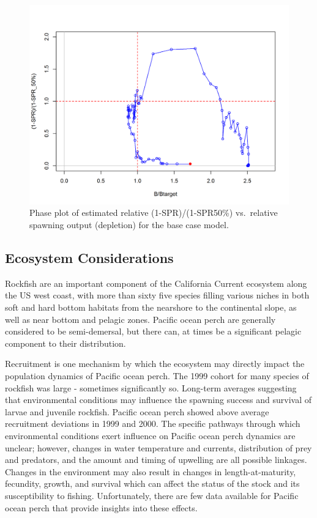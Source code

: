 \documentclass[12pt,]{article}
\begin{document}
\begin{figure}
\centering
\includegraphics{r4ss/plots_mod1/SPR4_phase.png}
\caption{Phase plot of estimated relative (1-SPR)/(1-SPR50\%)
vs.~relative spawning output (depletion) for the base case
model.\label{fig:Phase_all}}
\end{figure}

\FloatBarrier

\subsection*{Ecosystem Considerations}\label{ecosystem-considerations}

Rockfish are an important component of the California Current ecosystem
along the US west coast, with more than sixty five species filling
various niches in both soft and hard bottom habitats from the nearshore
to the continental slope, as well as near bottom and pelagic zones.
Pacific ocean perch are generally considered to be semi-demersal, but
there can, at times be a significant pelagic component to their
distribution.

Recruitment is one mechanism by which the ecosystem may directly impact
the population dynamics of Pacific ocean perch. The 1999 cohort for many
species of rockfish was large - sometimes significantly so. Long-term
averages suggesting that environmental conditions may influence the
spawning success and survival of larvae and juvenile rockfish. Pacific
ocean perch showed above average recruitment deviations in 1999 and
2000. The specific pathways through which environmental conditions exert
influence on Pacific ocean perch dynamics are unclear; however, changes
in water temperature and currents, distribution of prey and predators,
and the amount and timing of upwelling are all possible linkages.
Changes in the environment may also result in changes in
length-at-maturity, fecundity, growth, and survival which can affect the
status of the stock and its susceptibility to fishing. Unfortunately,
there are few data available for Pacific ocean perch that provide
insights into these effects.
\end{document}
